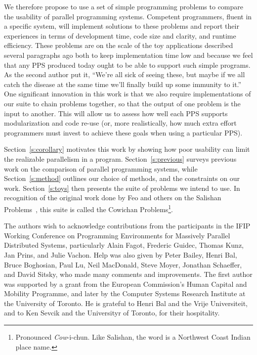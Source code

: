 We therefore propose to use a set of simple programming problems to compare
the usability of parallel programming systems.
Competent programmers, fluent in a specific system,
will implement solutions to these problems and report their experiences
in terms of development time, code size and clarity, and runtime efficiency.
These problems are on the scale of the toy applications described several paragraphs ago
both to keep implementation time low
and because we feel that any PPS produced today ought to be able to support such simple programs.
As the second author put it,
``We're all sick of seeing these,
but maybe if we all catch the disease at the same time we'll finally build up some immunity to it.''
One significant innovation in this work is that
we also require implementations of our suite to chain problems together,
so that the output of one problem is the input to another.
This will allow us to assess how well each PPS supports modularization and code re-use
(or, more realistically, how much extra effort programmers must invest
to achieve these goals when using a particular PPS).

Section~\ref{s:corollary} motivates this work by showing
how poor usability can limit the realizable parallelism in a program.
Section~\ref{s:previous} surveys previous work on the comparison of parallel programming systems,
while Section~\ref{s:method} outlines our choice of methods, and the constraints on our work.
Section~\ref{s:toys} then presents the suite of problems we intend to use.
In recognition of the original work done by Feo and others on
the Salishan Problems~\cite{b:salishan}, this suite is called
the Cowichan Problems\footnote{\noindent Pronounced {\em{Cow}\/}-i-chun.
	Like Salishan, the word is a Northwest Coast Indian place name.}.

The authors wish to acknowledge contributions from the participants in
the IFIP Working Conference on Programming Environments for Massively Parallel Distributed Systems,
particularly Alain Fagot, Frederic Guidec, Thomas Kunz, Jan Prins, and Julie Vachon.
Help was also given by Peter Bailey, Henri Bal, Bruce Boghosian, Paul Lu,
Neil MacDonald, Steve Moyer, Jonathan Schaeffer, and David Sitsky,
who made many comments and improvements.
The first author was supported by a grant from
the European Commission's Human Capital and Mobility Programme,
and later by the Computer Systems Research Institute at the University of Toronto.
He is grateful to Henri Bal and the Vrije Universiteit,
and to Ken Sevcik and the Universityr of Toronto,
for their hospitality.


